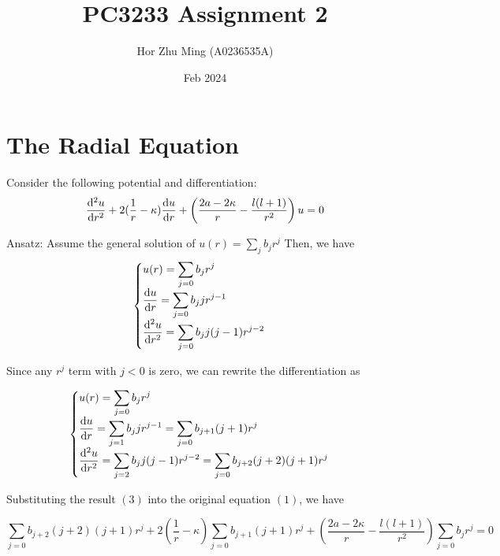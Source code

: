 \documentclass{article}
\title{PC3233 Assignment 2}
\author{Hor Zhu Ming (A0236535A)}
\date{Feb 2024}
\begin{document}
\maketitle

\section{The Radial Equation}
Consider the following potential and differentiation:
\begin{equation}
  \dv[2]{u}{r} + 2(\frac{1}{r} - \kappa) \dv{u}{r} + \left( \frac{2a-2\kappa}{r} - \frac{l(l+1)}{r^2}\right) u = 0
\end{equation}

Ansatz: Assume the general solution of $u(r) = \sum_{j} b_j r^{j}$
Then, we have
\begin{equation}
  \begin{cases}
    \displaystyle
    u(r) = \sum_{j = 0} b_j r^{j} \\
    \displaystyle
    \dv{u}{r} = \sum_{j = 0} b_j j r^{j-1} \\
    \displaystyle
    \dv[2]{u}{r} = \sum_{j = 0} b_j j (j-1) r^{j-2} \\
  \end{cases}
\end{equation}

Since any $r^{j}$ term with $j < 0$ is zero, we can rewrite the differentiation as

\begin{equation}
  \begin{cases}
    \displaystyle
    u(r) = \sum_{j = 0} b_j r^{j} \\
    \displaystyle
    \dv{u}{r} = \sum_{j = 1} b_j j r^{j-1} = \sum_{j = 0} b_{j+1} (j+1) r^{j} \\
    \displaystyle
    \dv[2]{u}{r} = \sum_{j = 2} b_j j (j-1) r^{j-2} = \sum_{j = 0} b_{j+2} (j+2) (j+1) r^{j} \\
  \end{cases}
\end{equation}

Substituting the result $(3)$ into the original equation $(1)$, we have

\begin{equation*}
    \sum_{j = 0} b_{j+2} (j+2) (j+1) r^{j} + 2(\frac{1}{r} - \kappa) \sum_{j = 0} b_{j+1} (j+1) r^{j} + \left( \frac{2a-2\kappa}{r} - \frac{l(l+1)}{r^2}\right) \sum_{j = 0} b_j r^{j} = 0
\end{equation*}
\end{document}
